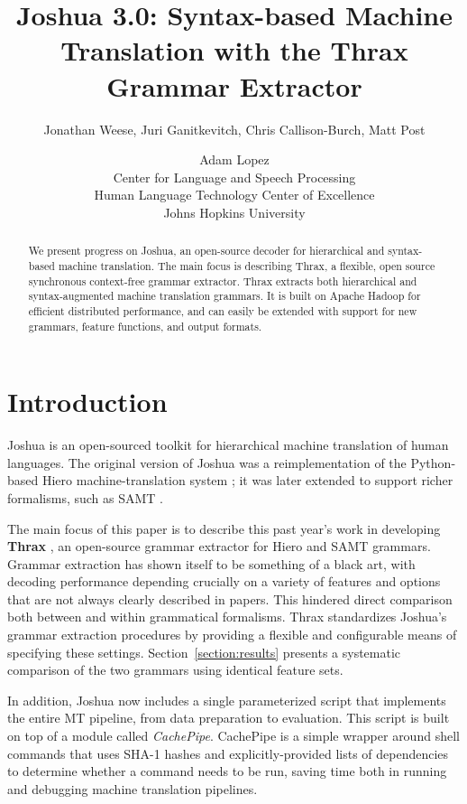 \documentclass[11pt]{article}
\title{Joshua 3.0: Syntax-based Machine Translation with the Thrax
  Grammar Extractor}
\author{Jonathan Weese\aff, Juri Ganitkevitch\aff, Chris
  Callison-Burch\aff, Matt Post\afff \and Adam Lopez\aff\afff \\
\aff Center for Language and Speech Processing \\
\afff Human Language Technology Center of Excellence \\
Johns Hopkins University}
\date{}
\begin{document}
\maketitle

\begin{abstract}
We present progress on Joshua, an open-source decoder for hierarchical
and syntax-based machine translation.  The main focus is describing
Thrax, a flexible, open source synchronous context-free grammar
extractor.  Thrax extracts both hierarchical \cite{Chiang2007} and
syntax-augmented machine translation \cite{samt2006} grammars.  It is
built on Apache Hadoop for efficient distributed performance, and can
easily be extended with support for new grammars, feature functions,
and output formats.
\end{abstract}

\section{Introduction}

Joshua is an open-sourced toolkit for hierarchical machine translation
of human languages.  The original version of Joshua \cite{Joshua-WMT}
was a reimplementation of the Python-based Hiero machine-translation
system \cite{Chiang2007}; it was later extended \cite{li2010joshua} to
support richer formalisms, such as SAMT \cite{samt2006}.

The main focus of this paper is to describe this past year's work in
developing {\bf Thrax} \cite{jonnymasters}, an open-source grammar extractor for Hiero and
SAMT grammars.  Grammar extraction has shown itself to be something of
a black art, with decoding performance depending crucially on a
variety of features and options that are not always clearly described in papers.
This hindered direct comparison both between and within grammatical formalisms.
Thrax standardizes Joshua's grammar extraction procedures by providing
a flexible and configurable means of specifying these settings.
Section~\ref{section:results} presents a systematic comparison of the
two grammars using identical feature sets.

In addition, Joshua now includes a single parameterized script that
implements the entire MT pipeline, from data preparation to
evaluation.  This script is built on top of a module called
\emph{CachePipe}.  CachePipe is a simple wrapper around shell commands
that uses SHA-1 hashes and explicitly-provided lists of dependencies
to determine whether a command needs to be run, saving time both in
running and debugging machine translation pipelines.
\end{document}
